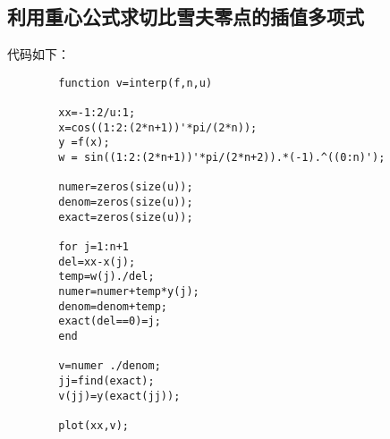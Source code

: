 \documentclass{article}
\begin{document}
	\subsection{利用重心公式求切比雪夫零点的插值多项式}
	代码如下：
	\begin{lstlisting}
		function v=interp(f,n,u)
		
		xx=-1:2/u:1;
		x=cos((1:2:(2*n+1))'*pi/(2*n));
		y =f(x);
		w = sin((1:2:(2*n+1))'*pi/(2*n+2)).*(-1).^((0:n)');
		
		numer=zeros(size(u));
		denom=zeros(size(u));
		exact=zeros(size(u));
		
		for j=1:n+1
		del=xx-x(j);
		temp=w(j)./del;
		numer=numer+temp*y(j);
		denom=denom+temp;
		exact(del==0)=j;
		end
		
		v=numer ./denom;
		jj=find(exact);
		v(jj)=y(exact(jj));
		
		plot(xx,v);
	\end{lstlisting}
\end{document}
